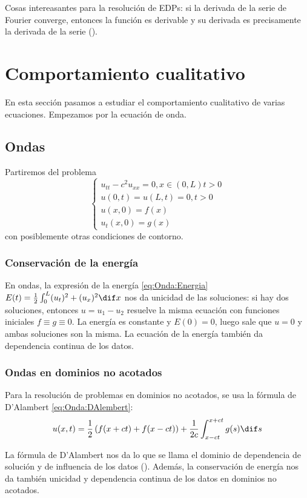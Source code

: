 Cosas intereasantes para la resolución de EDPs: si la derivada de la serie de Fourier converge, entonces la función es derivable y su derivada es precisamente la derivada de la serie ().

\section{Comportamiento cualitativo}

En esta sección pasamos a estudiar el comportamiento cualitativo de varias ecuaciones. Empezamos por la ecuación de onda.

\subsection{Ondas}

Partiremos del problema
\[ \begin{cases}
	u_{tt} - c^2 u_{xx} = 0, x \in (0,L) t > 0 \\
	u(0,t) = u(L,t) = 0, t > 0\\
	u(x,0) = f(x) \\
	u_t(x,0) = g(x)
\end{cases}\] con posiblemente otras condiciones de contorno.

\subsubsection{Conservación de la energía}

En ondas, la expresión de la energía \eqref{eq:Onda:Energia} $E(t) = \frac{1}{2} \int_0^L (u_t)^2 + (u_x)^2 \dif x$ nos da unicidad de las soluciones: si hay dos soluciones, entonces $u = u_1 - u_2$ resuelve la misma ecuación con funciones iniciales $f \equiv g \equiv 0$. La energía es constante y $E(0) = 0$, luego sale que $u = 0$ y ambas soluciones son la misma. La ecuación de la energía también da dependencia continua de los datos.

\subsubsection{Ondas en dominios no acotados}

Para la resolución de problemas en dominios no acotados, se usa la fórmula de D'Alambert  \eqref{eq:Onda:DAlembert}: \[ u(x,t) = \frac{1}{2} \left(f(x + ct) + f(x-ct)\right) + \frac{1}{2c} \int_{x-ct}^{x+ct} g(s) \dif s \]

La fórmula de D'Alambert nos da lo que se llama el dominio de dependencia de solución y de influencia de los datos (). Además, la conservación de energía nos da también unicidad y dependencia continua de los datos en dominios no acotados.

